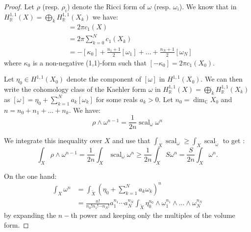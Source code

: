 \documentclass{amsart}
\numberwithin{equation}{section}
\theoremstyle {definition}
\DeclareMathOperator{\scal}{scal}
\begin{document}
\begin{proof}
Let $\rho$ (resp. $\rho_i$) denote the Ricci form of $\omega$ (resp. $\omega_i$). We know that in $H_{\mathbb{R}}^{1,1}(X)=\bigoplus_k H^{1,1}_\mathbb{R}(X_k)$ we have:
\begin{align*}
    [\rho]&=2\pi c_1(X)\\
    &=2\pi \sum_{k=0}^N c_1(X_k)\\
    &=-[\kappa_0]+\frac{n_1+1}{2}[\omega_1]+\dots+\frac{n_N+1}{2}[\omega_N]
\end{align*}
where $\kappa_0$ is a non-negative (1,1)-form such that $[-\kappa_0]=2\pi c_1(X_0)$.

Let $\eta_0\in H^{1,1}(X_0)$ denote the component of $[\omega]$ in $H^{1,1}(X_0)$. We can then write the cohomology class of the Kaehler form $\omega$ in $H_{\mathbb{R}}^{1,1}(X)=\bigoplus_k H^{1,1}_\mathbb{R}(X_k)$ as  $[\omega]=\eta_0+\sum_{k=1}^Na_k[\omega_k]$ for some reals $a_k>0$. %
Let $n_0=\dim_\mathbb{C}X_0$ and $n=n_0+n_1+\dots+n_k$. We have:
\[\rho\wedge\omega^{n-1}=\frac{1}{2n}\scal_\omega\omega^n%
\]

We integrate this inequality over $X$ and use that $\int_X\scal_\omega\geq\int_X\scal_{\tilde\omega}$
 to get :
\[\int_{X}\rho\wedge\omega^{n-1}=\frac{1}{2n}\int_X\scal_\omega\omega^n\geq\frac{1}{2n}\int_X S\omega^n =\frac{S}{2n}\int_{X}\omega^n.\]

On the one hand:
\begin{align*}
    \int_{X}\omega^{n}&=\int_{\tilde X}\left(\eta_0+\sum_{k=1}^Na_k\omega_k\right)^{n} \\
    &=\frac{n!}{n_0!n_1!\cdots n_N!}a_1^{n_1}\cdots a_N^{n_N}\int_{\tilde X}\eta_0^{n_0}\wedge\omega_1^{n_1}\wedge\dots\wedge\omega_N^{n_N}
\end{align*}
by expanding the $n-$th power and keeping only the multiples of the volume form.


\end{proof}
\end{document}
